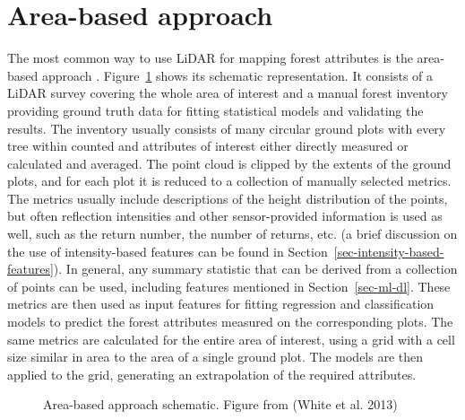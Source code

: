 \section{Area-based approach}\label{sec-area-based-approach}

The most common way to use LiDAR for mapping forest attributes is the area-based approach \cite{whiteABAGuide2013}.
Figure~\ref{fig-aba-schema} shows its schematic representation.
It consists of a LiDAR survey covering the whole area of interest and a manual forest inventory providing ground truth data for fitting statistical models and validating the results.
The inventory usually consists of many circular ground plots with every tree within counted and attributes of interest either directly measured or calculated and averaged.
The point cloud is clipped by the extents of the ground plots, and for each plot it is reduced to a collection of manually selected metrics.
The metrics usually include descriptions of the height distribution of the points, but often reflection intensities and other sensor-provided information is used as well, such as the return number, the number of returns, etc. (a brief discussion on the use of intensity-based features can be found in Section~\ref{sec-intensity-based-features}).
In general, any summary statistic that can be derived from a collection of points can be used, including features mentioned in Section~\ref{sec-ml-dl}.
These metrics are then used as input features for fitting regression and classification models to predict the forest attributes measured on the corresponding plots.
The same metrics are calculated for the entire area of interest, using a grid with a cell size similar in area to the area of a single ground plot.
The models are then applied to the grid, generating an extrapolation of the required attributes.

\begin{figure}
\caption{\label{fig-aba-schema}Area-based approach schematic. Figure
from (White et al. 2013)}
\end{figure}

